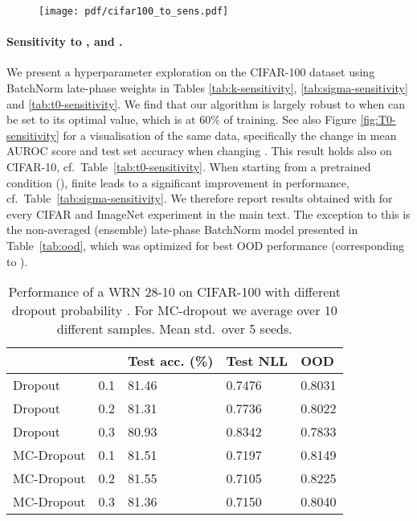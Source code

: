 \documentclass{article} \usepackage{iclr2021_conference,times}
\begin{document}
\begin{figure}
  \centering
  \begin{center}
    \texttt{[image: pdf/cifar100\_to\_sens.pdf]}
  \end{center}
   \vspace{-0.4cm}
\end{figure}

\paragraph{Sensitivity to ,  and .} We present a hyperparameter exploration on the CIFAR-100 dataset using BatchNorm late-phase weights in Tables  \ref{tab:k-sensitivity}, \ref{tab:sigma-sensitivity} and \ref{tab:t0-sensitivity}. We find that our algorithm is largely robust to  when  can be set to its optimal value, which is at 60\% of training. See also Figure \ref{fig:T0-sensitivity} for a visualisation of the same data, specifically the change in mean AUROC score and test set accuracy when changing . This result holds also on CIFAR-10, cf.~Table~\ref{tab:t0-sensitivity}. When starting from a pretrained condition (), finite  leads to a significant improvement in performance, cf.~Table~\ref{tab:sigma-sensitivity}. We therefore report results obtained with  for every CIFAR and ImageNet experiment in the main text. The exception to this is the non-averaged (ensemble) late-phase BatchNorm model presented in Table~\ref{tab:ood}, which was optimized for best OOD performance (corresponding to ).


\begin{table}[h!]
\centering
\caption{Performance of a WRN 28-10 on CIFAR-100 with different dropout probability . For MC-dropout we average over 10 different samples.  Mean  std.~over 5 seeds. \label{tab:dropout}}
\vspace{-0.2cm}
\begin{tabular}{lllll}
\toprule
   &  & Test acc. (\%) & Test NLL & OOD \\\midrule
Dropout & 0.1 &    81.46       &0.7476&      0.8031    \\
Dropout & 0.2 &    81.31       &0.7736&      0.8022    \\
Dropout & 0.3 &    80.93       &0.8342&      	0.7833    \\\midrule

MC-Dropout & 0.1 &  81.51     &0.7197&      0.8149    \\
MC-Dropout & 0.2  &    81.55       &0.7105&      0.8225    \\
MC-Dropout & 0.3 &  81.36  &0.7150&      0.8040    \\\bottomrule  
\end{tabular}
\end{table}
\end{document}
